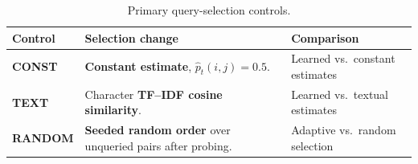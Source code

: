 \begin{table}[!htbp]
  \centering
  \caption{Primary query-selection controls.}
  \label{tab:rq2-controls}
  \begingroup
  \fontsize{8.5}{9.6}\selectfont
  \setlength{\tabcolsep}{5pt}
  \renewcommand{\arraystretch}{1.0}
  \setlength{\heavyrulewidth}{0.7pt}
  \setlength{\lightrulewidth}{0.35pt}
  \setlength{\aboverulesep}{1.4pt}
  \setlength{\belowrulesep}{1.8pt}
  \begin{tabularx}{\linewidth}{@{}l>{\raggedright\arraybackslash}Xl@{}}
    \toprule
    \textbf{Control} & \textbf{Selection change} & \textbf{Comparison} \\
    \midrule
    \textbf{CONST} & \textbf{Constant estimate}, $\widehat{p}_t(i,j)=0.5$.
      & Learned vs.\ constant estimates \\
    \addlinespace[2pt]
    \textbf{TEXT} & Character \textbf{TF--IDF cosine similarity}.
      & Learned vs.\ textual estimates \\
    \addlinespace[2pt]
    \textbf{RANDOM} & \textbf{Seeded random order} over unqueried pairs after probing.
      & Adaptive vs.\ random selection \\
    \bottomrule
  \end{tabularx}
  \endgroup
\end{table}
